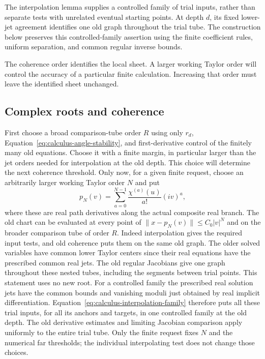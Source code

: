 The interpolation lemma supplies a controlled family of trial inputs,
rather than separate tests with unrelated eventual starting points.
At depth $d$, its fixed lower-jet agreement identifies one old graph
throughout the trial tube.  The construction below preserves this
controlled-family assertion using the finite coefficient rules, uniform
separation, and common regular inverse bounds.

The coherence order identifies the local sheet.  A larger working Taylor
order will control the accuracy of a particular finite calculation.
Increasing that order must leave the identified sheet unchanged.

\subsection{Complex roots and coherence}

First choose a broad comparison-tube order $R$ using only $r_d$,
Equation~\eqref{eq:calculus-angle-stability}, and first-derivative control
of the finitely many old equations.  Choose it with a finite margin,
in particular larger than the jet orders needed for interpolation at the
old depth.  This choice will determine the next coherence threshold.
Only now, for a given finite request, choose an arbitrarily larger working
Taylor order $N$ and put
\begin{equation}
 p_N(v)=\sum_{a=0}^{N-1}\frac{\chi^{(a)}(u)}{a!}(iv)^a,
 \label{eq:calculus-taylor-center}
\end{equation}
where these are real path derivatives along the actual composite real
branch.  The old chart can be evaluated at every point of
$\|x-p_N(v)\|\le C_0|v|^N$ and on the broader comparison tube of order
$R$.  Indeed interpolation gives the required input tests, and old
coherence puts them on the same old graph.  The older solved variables
have common lower Taylor centers since their real equations have the
prescribed common real jets.  The old regular Jacobians give one graph
throughout these nested tubes, including the segments between trial
points.  This statement uses no new root.
For a controlled family the prescribed real solution jets have the common
bounds and vanishing moduli just obtained by real implicit
differentiation.  Equation~\eqref{eq:calculus-interpolation-family}
therefore puts all these trial inputs, for all its anchors and targets,
in one controlled family at the old depth.  The old derivative estimates
and limiting Jacobian comparison apply uniformly to the entire trial
tube.  Only the finite request fixes $N$ and the numerical far thresholds;
the individual interpolating test does not change those choices.

